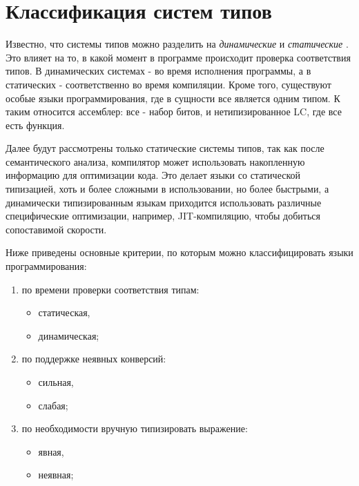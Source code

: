 \chapter{Классификация систем типов}
\label{ch:classification}

Известно, что системы типов можно разделить на \textit{динамические} и \textit{статические} \cite{Typing}.
Это влияет на то, в какой момент в программе происходит проверка соответствия типов.
В динамических системах - во время исполнения программы, а в статических - соответственно во время компиляции.
Кроме того, существуют особые языки программирования, где в сущности все является одним типом.
К таким относится ассемблер: все - набор битов, и нетипизированное \gls{LC}, где все есть функция.

Далее будут рассмотрены только статические системы типов, так как после семантического анализа, компилятор может использовать накопленную информацию для оптимизации кода.
Это делает языки со статической типизацией, хоть и более сложными в использовании, но более быстрыми, а динамически типизированным языкам приходится использовать различные специфические оптимизации, например, JIT-компиляцию, чтобы добиться сопоставимой скорости.

Ниже приведены основные критерии, по которым можно классифицировать языки программирования:

\begin{enumerate}
    \item по времени проверки соответствия типам:
    \begin{itemize}
        \item статическая,
        \item динамическая;
    \end{itemize}
    \item по поддержке неявных конверсий:
    \begin{itemize}
        \item сильная,
        \item слабая;
    \end{itemize}
    \item по необходимости вручную типизировать выражение:
    \begin{itemize}
        \item явная,
        \item неявная;
    \end{itemize}
\end{enumerate}


